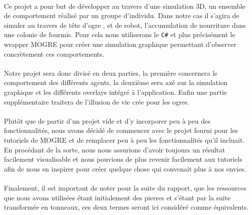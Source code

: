 \paragraph{}
Ce projet a pour but de développer au travers d'une simulation 3D, un
ensemble de comportement réalisé par un groupe d'individu. Dans notre cas il
s'agira de simuler au travers de tête d'ogre , et de robot, l'accumulation de
nourriture dans une colonie de fourmis. Pour cela nous utiliserons le
\verb!C#! et plus précisément le wrapper MOGRE pour créer une simulation
graphique permettant d'observer concrètement ces comportements.

\paragraph{}

Notre projet sera donc divisé en deux parties, la première concernera 
le comportement des différents agents, la deuxième sera axé sur la simulation
graphique et les différents overlays intégré à l'application. Enfin une partie
supplémentaire traitera de l'illusion de vie crée pour les ogres.

\paragraph{}
Plutôt que de partir d'un projet vide et d'y incorporer peu à peu des
fonctionnalités, nous avons décidé de commencer avec le projet fourni pour
les tutoriels de MOGRE et de remplacer peu à peu les fonctionnalités qu'il
incluait. En procédant de la sorte, nous nous assurions d'avoir toujours un
résultat facilement visualisable et nous pouvions de plus revenir facilement aux
tutoriels afin de nous en inspirer pour créer quelque chose qui convenait plus à
nos envies.

\paragraph{}
Finalement, il est important de noter pour la suite du rapport, que les
ressources que nous avons utilisées étant initialement des pierres et s'étant
par la suite transformée en tonneaux, ces deux termes seront ici considéré comme
équivalents.
